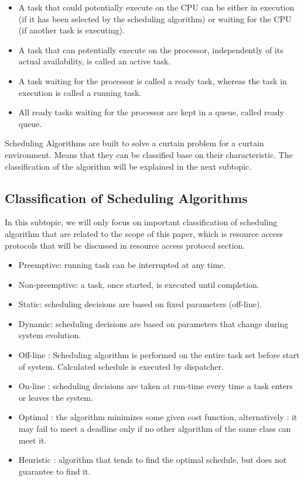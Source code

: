 \begin{itemize}
\item A task that could potentially execute on the CPU can be either in execution (if it has been selected by the scheduling algorithm) or waiting for the CPU (if another task is executing)\cite{b5}.

\item A task that can potentially execute on the processor, independently of its actual availability, is called an active task\cite{b5}.

\item A task waiting for the processor is called a ready task, whereas the task in execution is called a running task\cite{b5}.

\item All ready tasks waiting for the processor are kept in a queue, called ready queue\cite{b5}.

\end{itemize}

Scheduling Algorithms are built to solve a curtain problem for a curtain environment. Means that they can be classified base on their characteristic. The classification of the algorithm will be explained in the next subtopic.

\subsection{Classification of Scheduling Algorithms}

In this subtopic, we will only focus on important classification of scheduling algorithm that are related to the scope of this paper, which is resource access protocols that will be discussed in resource access protocol section. 

\begin{itemize}
\item Preemptive: running task can be interrupted at any time\cite{b5}.
\item Non-preemptive: a task, once started, is executed until completion\cite{b5}.
\item Static: scheduling decisions are based on fixed parameters (off-line)\cite{b5}.
\item Dynamic: scheduling decisions are based on parameters that change during system evolution\cite{b5}.
\item Off-line : Scheduling algorithm is performed on the entire task set before start of system. Calculated schedule is executed by dispatcher\cite{b5}. 
\item On-line : scheduling decisions are taken at run-time every time a task enters or leaves the system\cite{b5}.
\item Optimal : the algorithm minimizes some given cost function, alternatively : it may fail to meet a deadline only if no other algorithm of the same class can meet it\cite{b5}.
\item Heuristic : algorithm that tends to find the optimal schedule, but does not guarantee to find it\cite{b5}.
\end{itemize}

